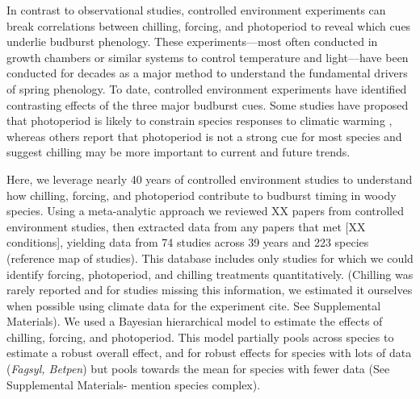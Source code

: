 \documentclass[11pt,letter]{article}
\begin{document}
\par In contrast to observational studies, controlled environment experiments can break correlations between chilling, forcing, and photoperiod to reveal which cues underlie budburst phenology. These experiments---most often conducted in growth chambers or similar systems to control temperature and light---have been conducted for decades as a major method to understand the fundamental drivers of spring phenology. To date, controlled environment experiments have identified contrasting effects of the three major budburst cues. Some studies have proposed that photoperiod is likely to constrain species responses to climatic warming \citep{Basler:2012, Caffarra:2011b,Caffarra:2011a}, whereas others report that photoperiod is not a strong cue for most species \citep{zohner2016,Laube:2014a} and suggest chilling may be more important to current and future trends. 

\par Here, we leverage nearly 40 years of controlled environment studies to understand how chilling, forcing, and photoperiod contribute to budburst timing in woody species. Using a meta-analytic approach we reviewed XX papers from controlled environment studies, then extracted data from any papers that met [XX conditions], yielding data from 74 studies across 39 years and 223 species (reference map of studies).  This database includes only studies for which we could identify forcing, photoperiod, and chilling treatments quantitatively. (Chilling was rarely reported and for studies missing this information, we estimated it ourselves when possible using climate data for the experiment cite. See Supplemental Materials). We used a Bayesian hierarchical model to estimate the effects of chilling, forcing, and photoperiod. This model partially pools across species to estimate a robust overall effect, and for robust effects for species with lots of data (\emph{Fagsyl, Betpen}) but pools towards the mean for species with fewer data (See Supplemental Materials- mention species complex).\\
\end{document}
